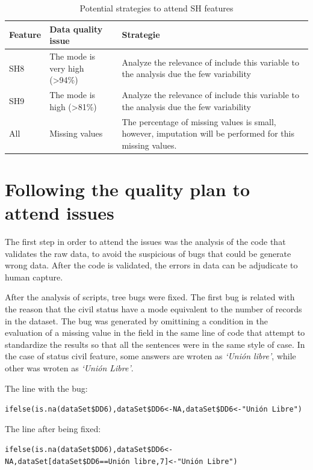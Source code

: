 \documentclass[]{book}
\begin{document}
\begin{table}[ht]
\centering
\caption{Potential strategies to attend SH features}
\label{Tab:Potential-strategies-to-attend-SH-features}
\begin{tabular}{|l|p{4cm}|p{8cm}|}
\hline
Feature & Data quality issue  & Strategie  \\ 
\hline
SH8 & The mode is very high (\textgreater94\%) & Analyze the relevance of include this variable to the analysis due the few variability   \\ 
\hline
SH9 & The mode is high (\textgreater81\%)      & Analyze the relevance of include this variable to the analysis due the few variability \\ 
\hline
All & Missing values                           & The percentage of missing values is small, however, imputation will be performed for this missing values. \\ 
\hline
\end{tabular}
\end{table}

\section{Following the quality plan to attend
issues}\label{following-the-quality-plan-to-attend-issues}

The first step in order to attend the issues was the analysis of the
code that validates the raw data, to avoid the suspicious of bugs that
could be generate wrong data. After the code is validated, the errors in
data can be adjudicate to human capture.

After the analysis of scripts, tree bugs were fixed. The first bug is
related with the reason that the civil status have a mode equivalent to
the number of records in the dataset. The bug was generated by
omittining a condition in the evaluation of a missing value in the field
in the same line of code that attempt to standardize the results so that
all the sentences were in the same style of case. In the case of status
civil feature, some answers are wroten as \emph{`Unión libre'}, while
other was wroten as \emph{`Unión Libre'}.

The line with the bug:

\texttt{ifelse(is.na(dataSet\$DD6),dataSet\$DD6\textless{}-NA,dataSet\$DD6\textless{}-"Unión\ Libre")}

The line after being fixed:

\texttt{ifelse(is.na(dataSet\$DD6),dataSet\$DD6\textless{}-NA,dataSet{[}dataSet\$DD6==\textquotesingle{}Unión\ libre\textquotesingle{},7{]}\textless{}-"Unión\ Libre")}
\end{document}
